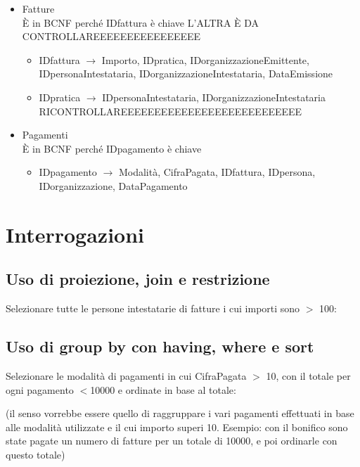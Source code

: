 \documentclass[a4paper,12pt]{article}
\begin{document}
\begin{itemize}
\item Fatture\\È in BCNF perché IDfattura è chiave L'ALTRA È DA CONTROLLAREEEEEEEEEEEEEEEE

\begin{itemize}
\item IDfattura $\rightarrow$ Importo, IDpratica, IDorganizzazioneEmittente, IDpersonaIntestataria, IDorganizzazioneIntestataria, DataEmissione

\item IDpratica $\rightarrow$ IDpersonaIntestataria, IDorganizzazioneIntestataria RICONTROLLAREEEEEEEEEEEEEEEEEEEEEEEEEEE
\end{itemize}

\item Pagamenti\\È in BCNF perché IDpagamento è chiave

\begin{itemize}
\item IDpagamento $\rightarrow$ Modalità, CifraPagata, IDfattura, IDpersona, IDorganizzazione, DataPagamento
\end{itemize}

\end{itemize}

 \section{ Interrogazioni }


 \subsection{ Uso di proiezione, join e restrizione }
Selezionare tutte le persone intestatarie di fatture i cui importi sono $>$ 100:



 \subsection{ Uso di group by con having, where e sort }

Selezionare le modalità di pagamenti in cui CifraPagata $>$ 10, con il totale per ogni pagamento $<$10000 e ordinate in base al totale:

(il senso vorrebbe essere quello di raggruppare i vari pagamenti effettuati in base alle modalità utilizzate e il cui importo superi 10. Esempio: con il bonifico sono state pagate un numero di fatture per un totale di 10000, e poi ordinarle con questo totale)
\end{document}
